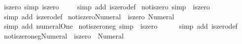 \begin{isabellebody}
\isamarkupfalse%
\ iszero{\isacharunderscore}{\kern0pt}{}\ {\isacharbrackleft}{\kern0pt}simp{\isacharbrackright}{\kern0pt}{\isacharcolon}{\kern0pt}\ {\isachardoublequoteopen}iszero\ {}{\isachardoublequoteclose}\isanewline
%
\isadelimproof
\ \ %
\endisadelimproof
%
\isatagproof
{}\isamarkupfalse%
\ {\isacharparenleft}{\kern0pt}simp\ add{\isacharcolon}{\kern0pt}\ iszero{\isacharunderscore}{\kern0pt}def{\isacharparenright}{\kern0pt}%
\endisatagproof
{\isafoldproof}%
%
\isadelimproof
\isanewline
%
\endisadelimproof
\isanewline
{}\isamarkupfalse%
\ not{\isacharunderscore}{\kern0pt}iszero{\isacharunderscore}{\kern0pt}{}\ {\isacharbrackleft}{\kern0pt}simp{\isacharbrackright}{\kern0pt}{\isacharcolon}{\kern0pt}\ {\isachardoublequoteopen}{\isasymnot}\ iszero\ {}{\isachardoublequoteclose}\isanewline
%
\isadelimproof
\ \ %
\endisadelimproof
%
\isatagproof
{}\isamarkupfalse%
\ {\isacharparenleft}{\kern0pt}simp\ add{\isacharcolon}{\kern0pt}\ iszero{\isacharunderscore}{\kern0pt}def{\isacharparenright}{\kern0pt}%
\endisatagproof
{\isafoldproof}%
%
\isadelimproof
\isanewline
%
\endisadelimproof
\isanewline
{}\isamarkupfalse%
\ not{\isacharunderscore}{\kern0pt}iszero{\isacharunderscore}{\kern0pt}Numeral{}{\isacharcolon}{\kern0pt}\ {\isachardoublequoteopen}{\isasymnot}\ iszero\ Numeral{}{\isachardoublequoteclose}\isanewline
%
\isadelimproof
\ \ %
\endisadelimproof
%
\isatagproof
{}\isamarkupfalse%
\ {\isacharparenleft}{\kern0pt}simp\ add{\isacharcolon}{\kern0pt}\ numeral{\isacharunderscore}{\kern0pt}One{\isacharparenright}{\kern0pt}%
\endisatagproof
{\isafoldproof}%
%
\isadelimproof
\isanewline
%
\endisadelimproof
\isanewline
{}\isamarkupfalse%
\ not{\isacharunderscore}{\kern0pt}iszero{\isacharunderscore}{\kern0pt}neg{\isacharunderscore}{\kern0pt}{}\ {\isacharbrackleft}{\kern0pt}simp{\isacharbrackright}{\kern0pt}{\isacharcolon}{\kern0pt}\ {\isachardoublequoteopen}{\isasymnot}\ iszero\ {\isacharparenleft}{\kern0pt}{\isacharminus}{\kern0pt}\ {}{\isacharparenright}{\kern0pt}{\isachardoublequoteclose}\isanewline
%
\isadelimproof
\ \ %
\endisadelimproof
%
\isatagproof
{}\isamarkupfalse%
\ {\isacharparenleft}{\kern0pt}simp\ add{\isacharcolon}{\kern0pt}\ iszero{\isacharunderscore}{\kern0pt}def{\isacharparenright}{\kern0pt}%
\endisatagproof
{\isafoldproof}%
%
\isadelimproof
\isanewline
%
\endisadelimproof
\isanewline
{}\isamarkupfalse%
\ not{\isacharunderscore}{\kern0pt}iszero{\isacharunderscore}{\kern0pt}neg{\isacharunderscore}{\kern0pt}Numeral{}{\isacharcolon}{\kern0pt}\ {\isachardoublequoteopen}{\isasymnot}\ iszero\ {\isacharparenleft}{\kern0pt}{\isacharminus}{\kern0pt}\ Numeral{}{\isacharparenright}{\kern0pt}{\isachardoublequoteclose}\isanewline

\end{isabellebody}
